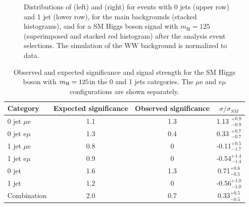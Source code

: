 \begin{figure}
{}
\caption{Distributions of \mll (left) and \mt (right) for events with 0 jets (upper row) and 1 jet (lower row), for the main backgrounds (stacked histograms), and for a SM Higgs boson signal with $m_\mathrm{H}=125$\GeV (superimposed and stacked red histogram) after the analysis event selections. The simulation of the WW background is normalized to data.}\label{fig:mllandmt}
\end{figure}

\begin{table}[!htb]
\caption{Observed and expected significance and signal strength for the SM Higgs boson with $m_{\rm H}=125$\GeV in the 0 and 1 jets categories. The $\mu$e and e$\mu$ configurations are shown separately.}\label{tab:13TeVsignif}
\begin{center}
\begin{tabular}{lccc}
\toprule
Category  &  Expected significance      &  Observed  significance    &  $\sigma/\sigma_{SM}$     \\
\midrule
0 jet  $\mu$e   &     1.1        &  1.3        &  1.13 $_{-0.9}^{+0.9}$             \\ [5pt]   

0 jet  e$\mu$   &     1.3        &  0.4        &  0.33 $_{-0.7}^{+0.7}$             \\ [5pt]   

1 jet  $\mu$e   &     0.8        &  0          &  -0.11$_{-1.7}^{+0.5}$                 \\ [5pt] 

1 jet  e$\mu$   &     0.9        &  0          &  -0.54$_{-1.4}^{+1.4}$                 \\ [5pt] 

\midrule 

0 jet           &     1.6        &  1.3       &  0.71$_{-0.5}^{+0.6}$             \\ [5pt]  

1 jet           &     1.2        &  0         &  -0.56$_{-1.0}^{+1.0}$                \\ [5pt]  

\midrule 
Combination     &     2.0        &  0.7       &  0.33$_{-0.5}^{+0.5}$              \\ [5pt]  
\bottomrule
\end{tabular}
\end{center}
\end{table}


